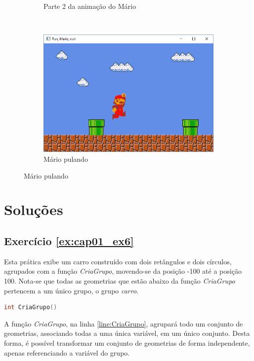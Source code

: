 \begin{enumerate}
\begin{figure}[!htp]
\begin{subfigure}[t]{0.3\textwidth}
        \caption{Parte 2 da animação do Mário}
        \label{fig:cap01_ex6c}
    \end{subfigure}
    ~
    \begin{subfigure}[t]{0.3\textwidth}
        \centerline{\includegraphics[width=.9\textwidth]{img/cap1_ex25d}}
        \caption{Mário pulando}
        \label{fig:cap01_ex6c}
    \end{subfigure}

  \end{figure}

\end{enumerate}

\section*{Soluções}

\subsection*{Exercício \ref{ex:cap01_ex6}}

Esta prática exibe um carro construído com dois retângulos e dois círculos, agrupados com a função \emph{CriaGrupo}, movendo-se da posição -100 até a posição 100. Nota-se que todas as geometrias que estão abaixo da função \emph{CriaGrupo} pertencem a um único grupo, o grupo \emph{carro}.


\begin{lstlisting}[label={func:CriaGrupo},language=C++]
int CriaGrupo()
\end{lstlisting}
A função \emph{CriaGrupo}, na linha \ref{line:CriaGrupo}, agrupará todo um conjunto de geometrias, associando todas a uma única variável, em um único conjunto. Desta forma, é possível transformar um conjunto de geometrias de forma independente, apenas referenciando a variável do grupo.

